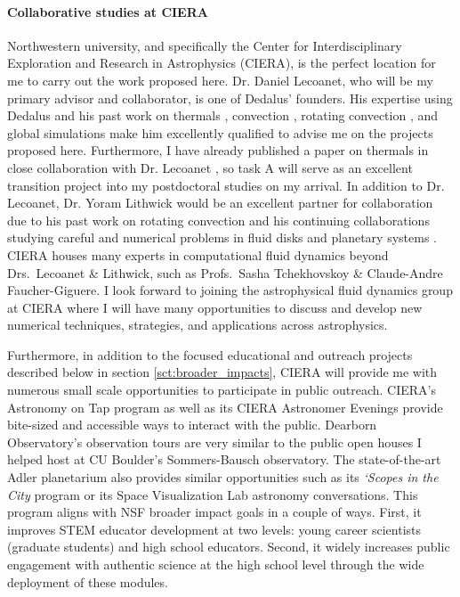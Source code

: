 \documentclass[11pt, preprint]{aastex}
\begin{document}
\paragraph{Collaborative studies at CIERA}
\label{sct:ciera}
Northwestern university, and specifically the Center for Interdisciplinary Exploration and Research in Astrophysics (CIERA), is the perfect location for me to carry out the work proposed here.
Dr. Daniel Lecoanet, who will be my primary advisor and collaborator, is one of Dedalus' founders.
His expertise using Dedalus and his past work on thermals \citep{lecoanet&jeevanjee2019, tarshis&all2018}, convection \citep{lecoanet&quataert2013, lecoanet&all2014, couston&all2017}, rotating convection \citep{couston&all2019}, and global simulations \citep{lecoanet&all2018} make him excellently qualified to advise me on the projects proposed here.
Furthermore, I have already published a paper on thermals in close collaboration with Dr. Lecoanet \citep{andersLB2019}, so task A will serve as an excellent transition project into my postdoctoral studies on my arrival.
In addition to Dr. Lecoanet, Dr. Yoram Lithwick would be an excellent partner for collaboration due to his past work on rotating convection \citep{BDLithwick2014} and his continuing collaborations studying careful and numerical problems in fluid disks \citep{LDLithwick2019} and planetary systems \citep{hadden&lithwick2018}.
CIERA houses many experts in computational fluid dynamics beyond Drs.~Lecoanet \& Lithwick, such as Profs.~Sasha Tchekhovskoy \& Claude-Andre Faucher-Giguere.
I look forward to joining the astrophysical fluid dynamics group at CIERA where I will have many opportunities to discuss and develop new numerical techniques, strategies, and applications across astrophysics.


Furthermore, in addition to the focused educational and outreach projects described below in section \ref{sct:broader_impacts}, CIERA will provide me with numerous small scale opportunities to participate in public outreach.
CIERA's Astronomy on Tap program as well as its CIERA Astronomer Evenings provide bite-sized and accessible ways to interact with the public.
Dearborn Observatory's observation tours are very similar to the public open houses I helped host at CU Boulder's Sommers-Bausch observatory.
The state-of-the-art Adler planetarium also provides similar opportunities such as its \emph{`Scopes in the City} program or its Space Visualization Lab astronomy conversations.
This program aligns with NSF broader impact goals in a couple of ways.
First, it improves STEM educator development at two levels: young career scientists (graduate students) and high school educators.
Second, it widely increases public engagement with authentic science at the high school level through the wide deployment of these modules.
\end{document}
